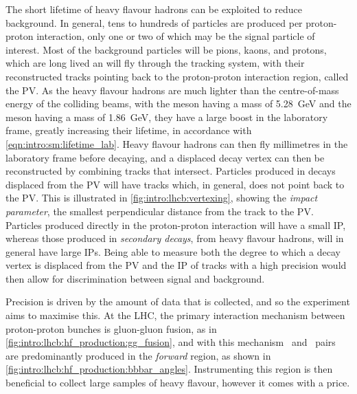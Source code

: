 The short lifetime of heavy flavour hadrons can be exploited to reduce 
background.
In general, tens to hundreds of particles are produced per proton-proton 
interaction, only one or two of which may be the signal particle of interest.
Most of the background particles will be pions, kaons, and protons, which are 
long lived an will fly through the tracking system, with their reconstructed 
tracks pointing back to the proton-proton interaction region, called the 
\ac{PV}.
As the heavy flavour hadrons are much lighter than the centre-of-mass energy of 
the colliding beams, with the \PBz meson having a mass of \SI{5.28}{\GeV} and 
the \PDz meson having a mass of \SI{1.86}{\GeV}, they have a large boost in the 
laboratory frame, greatly increasing their lifetime, in accordance with 
\cref{eqn:intro:sm:lifetime_lab}.
Heavy flavour hadrons can then fly millimetres in the laboratory frame before 
decaying, and a displaced decay vertex can then be reconstructed by combining 
tracks that intersect.
Particles produced in decays displaced from the \ac{PV} will have tracks which, 
in general, does not point back to the \ac{PV}.
This is illustrated in \cref{fig:intro:lhcb:vertexing}, showing the 
\emph{impact parameter}, the smallest perpendicular distance from the track to 
the \ac{PV}.
Particles produced directly in the proton-proton interaction will have a small 
\ac{IP}, whereas those produced in \emph{secondary decays}, from heavy flavour 
hadrons, will in general have large \acp{IP}.
Being able to measure both the degree to which a decay vertex is displaced from 
the \ac{PV} and the \acl{IP} of tracks with a high precision would then allow 
for discrimination between signal and background.

Precision is driven by the amount of data that is collected, and so the 
experiment aims to maximise this.
At the \ac{LHC}, the primary interaction mechanism between proton-proton 
bunches is gluon-gluon fusion, as in 
\cref{fig:intro:lhcb:hf_production:gg_fusion}, and with this mechanism \bbbar\ 
and \ccbar\ pairs are predominantly produced in the \emph{forward} region, as 
shown in \cref{fig:intro:lhcb:hf_production:bbbar_angles}.
Instrumenting this region is then beneficial to collect large samples of heavy 
flavour, however it comes with a price.

